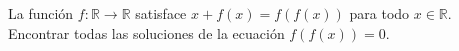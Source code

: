 \begin{problem}
	La función $f: \mathbb{R} \to \mathbb{R}$ satisface $x + f(x) = f(f(x))$ para todo $x \in \mathbb{R}$. Encontrar todas las soluciones de la ecuación $f(f(x)) = 0$.
\end{problem}
